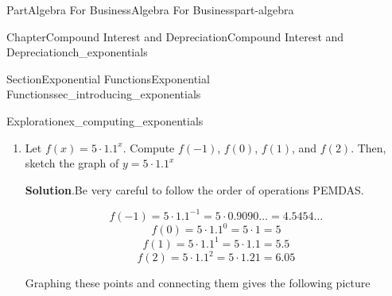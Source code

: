 \documentclass[oneside,10pt,]{tufte-book}
\newcommand{\blocktitlefont}{\relax}
\numberwithin{equation}{chapter}
\begin{document}
\begin{partptx}{Part}{Algebra For Business}{}{Algebra For Business}{}{}{part-algebra}
\begin{chapterptx}{Chapter}{Compound Interest and Depreciation}{}{Compound Interest and Depreciation}{}{}{ch_exponentials}
\begin{sectionptx}{Section}{Exponential Functions}{}{Exponential Functions}{}{}{sec_introducing_exponentials}
\begin{exploration}{Exploration}{}{ex_computing_exponentials}
\begin{enumerate}[font=\bfseries,label=(\alph*),ref=\alph*]
\begin{image}{0.25}{0.5}{0.25}{}
{
}%
\end{image}%
\item{}Let \(f(x) = 5\cdot 1.1^x\). Compute  \(f(-1)\), \(f(0)\), \(f(1)\), and \(f(2)\). Then, sketch the graph of \(y=5\cdot 1.1^x\)%
\par\smallskip%
\noindent\textbf{\blocktitlefont Solution}.\hypertarget{ex_computing_exponentials-2-2}{}\quad{}Be very careful to follow the order of operations PEMDAS.%
\par
%
\begin{equation*}
f(-1) = 5\cdot 1.1^{-1} = 5 \cdot 0.9090\dots = 4.5454\dots
\end{equation*}
%
\begin{equation*}
f(0) = 5\cdot 1.1^{0} = 5 \cdot 1 = 5
\end{equation*}
%
\begin{equation*}
f(1) = 5\cdot 1.1^{1} = 5 \cdot 1.1 = 5.5
\end{equation*}
%
\begin{equation*}
f(2) = 5\cdot 1.1^{2} = 5 \cdot 1.21 = 6.05
\end{equation*}
%
\par
Graphing these points and connecting them gives the following picture%
\begin{image}{0.25}{0.5}{0.25}{}%
\end{image}
\end{enumerate}
\end{exploration}
\end{sectionptx}
\end{chapterptx}
\end{partptx}
\end{document}
